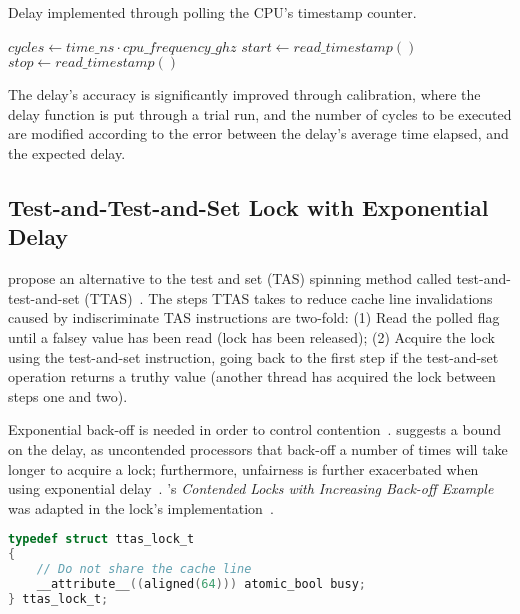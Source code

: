 \begin{algorithm}
    \caption{Delay implemented through polling the CPU's timestamp counter.}\label{alg:delay}
    \begin{algorithmic}[1]
            \State $cycles \gets time\_ns \cdot cpu\_frequency\_ghz$
            \State $start \gets read\_timestamp()$
            \Repeat
                \State $stop \gets read\_timestamp()$
        \EndFunction
    \end{algorithmic}
\end{algorithm}

The delay's accuracy is significantly improved through calibration, where the
delay function is put through a trial run, and the number of cycles to be
executed are modified according to the error between the delay's average time
elapsed, and the expected delay.

\subsection{Test-and-Test-and-Set Lock with Exponential Delay}
\citeauthor{rudolph1984dynamic} propose an alternative to the test and set
(TAS) spinning method called test-and-test-and-set
(TTAS)~\citep{rudolph1984dynamic}. The steps TTAS takes to reduce cache line
invalidations caused by indiscriminate TAS instructions are two-fold: (1) Read
the polled flag until a falsey value has been read (lock has been released);
(2) Acquire the lock using the test-and-set instruction, going back to the
first step if the test-and-set operation returns a truthy value (another thread
has acquired the lock between steps one and two). 

Exponential back-off is needed in order to control
contention~\citep{valois1994queues}. \citeauthor{anderson1990performance}
suggests a bound on the delay, as uncontended processors that back-off a number
of times will take longer to acquire a lock; furthermore, unfairness is further
exacerbated when using exponential delay~\citep[Section~7.4]{herlihy2020art}.
\citeauthor{intelmanualoptimization}'s \emph{Contended Locks with Increasing
Back-off Example} was adapted in the lock's implementation~\citep{intelmanualoptimization}.

\begin{lstlisting}[language=C,caption={Test-and-Test-and-Set Lock Struct.}]
typedef struct ttas_lock_t
{
    // Do not share the cache line
    __attribute__((aligned(64))) atomic_bool busy;
} ttas_lock_t;

\end{lstlisting}

